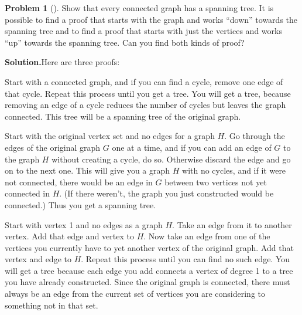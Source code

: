 \documentclass[10pt,]{book}
\theoremstyle{plain}
\theoremstyle{definition}
\newtheorem{activity}[project]{Problem}
\theoremstyle{definition}
\numberwithin{equation}{chapter}
\begin{document}
\begin{activity}[]\label{activity-117}
Show that every connected graph has a spanning tree. It is possible to find a proof that starts with the graph and works ``down'' towards the spanning tree and to find a proof that starts with just the vertices and works ``up'' towards the spanning tree. Can you find both kinds of proof?%
\par\medskip\noindent%
\textbf{Solution.}\quad Here are three proofs:%
\par
Start with a connected graph, and if you can find a cycle, remove one edge of that cycle. Repeat this process until you get a tree. You will get a tree, because removing an edge of a cycle reduces the number of cycles but leaves the graph connected. This tree will be a spanning tree of the original graph.%
\par
Start with the original vertex set and no edges for a graph \(H\). Go through the edges of the original graph \(G\) one at a time, and if you can add an edge of \(G\) to the graph \(H\) without creating a cycle, do so. Otherwise discard the edge and go on to the next one. This will give you a graph \(H\) with no cycles, and if it were not connected, there would be an edge in \(G\) between two vertices not yet connected in \(H\). (If there weren't, the graph you just constructed would be connected.) Thus you get a spanning tree.%
\par
Start with vertex 1 and no edges as a graph \(H\). Take an edge from it to another vertex. Add that edge and vertex to \(H\). Now take an edge from one of the vertices you currently have to yet another vertex of the original graph. Add that vertex and edge to \(H\). Repeat this process until you can find no such edge. You will get a tree because each edge you add connects a vertex of degree 1 to a tree you have already constructed. Since the original graph is connected, there must always be an edge from the current set of vertices you are considering to something not in that set.%
\end{activity}
\typeout{************************************************}
\typeout{************************************************}
\end{document}
